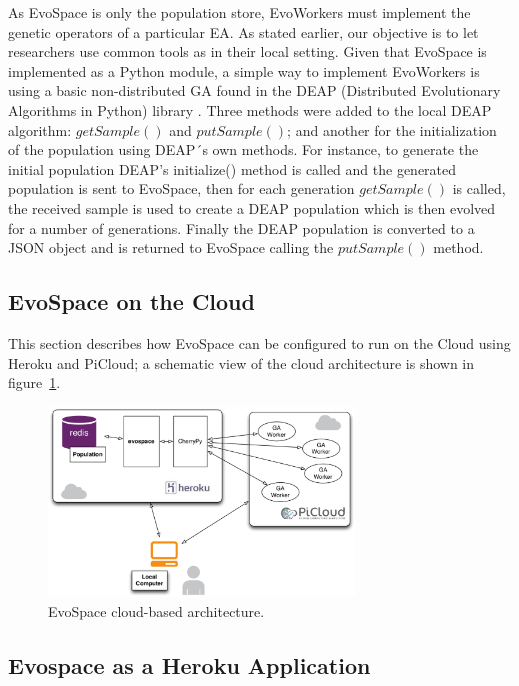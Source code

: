 As EvoSpace is only the population store, EvoWorkers must implement the genetic operators of a particular EA.
As stated earlier, our objective is to let researchers use common tools as in their local setting.
Given that EvoSpace is implemented as a Python module, a simple way to implement EvoWorkers is using a basic non-distributed GA found in the DEAP (Distributed Evolutionary Algorithms in Python) library \cite{DEAP_JMLR2012}.  Three methods were added to the local DEAP algorithm: $getSample()$ and  $putSample()$; and  another for the  initialization of the population using DEAP´s own methods.
For instance, to generate the initial population DEAP's initialize() method  is called and the generated population is sent to EvoSpace, then for each generation $getSample()$ is called, the received sample is used to create a DEAP population which is then evolved for a number of generations. Finally the DEAP population is converted to a JSON object and is returned to EvoSpace calling the $putSample()$ method.   


\subsection{EvoSpace on the Cloud}
This section describes how EvoSpace can be configured to run on the Cloud using Heroku and PiCloud; a schematic view of the cloud architecture is shown in figure~\ref{herokuPiCloud}.

\begin{figure}[t]
\centering
\includegraphics[width=3.2in]{herokuPiCloud.eps}
\caption{EvoSpace cloud-based architecture.}
\label{herokuPiCloud}
\end{figure}


\subsection{Evospace as a Heroku Application}

